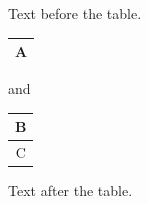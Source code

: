 \documentclass[12pt]{article}
\begin{document}
Text before the table.

\begin{tabular}{|c|}\hline A\\\hline\end{tabular} and \begin{tabular}{|c|}\hline B\\\hline C\\\hline\end{tabular}

Text after the table.
\end{document}
